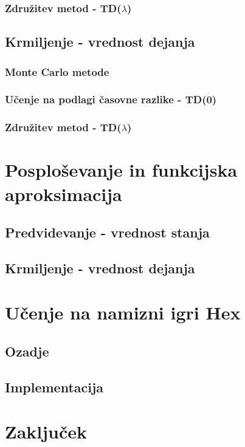 \documentclass[a4paper, oneside, 12pt]{article}
\begin{document}
\subsubsection{Združitev metod - TD($\lambda$)}
\subsection{Krmiljenje - vrednost dejanja}
\subsubsection{Monte Carlo metode}
\subsubsection{Učenje na podlagi časovne razlike - TD(0)}
\subsubsection{Združitev metod - TD($\lambda$)}
\newpage

\section{Posploševanje in funkcijska aproksimacija}
\subsection{Predvidevanje - vrednost stanja}
\subsection{Krmiljenje - vrednost dejanja}
\newpage

\section{Učenje na namizni igri Hex}
\subsection{Ozadje}
\subsection{Implementacija}
\newpage

\section{Zaključek}
\newpage
\end{document}
